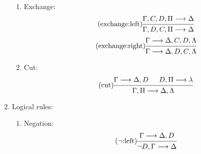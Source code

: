 \documentclass[11pt,a4paper]{article}
\begin{document}
\begin{definition}
\begin{enumerate}
\begin{enumerate}
            \item\label{it:exchange} Exchange:
                \begin{equation}
                    \tag{exchange:left}
                    \label{eq:exchange:left}
                    \begin{prooftree}
                        \hypo{\Gamma,C, D, \Pi\seq\Delta}
                        \infer1{\Gamma, D, C, \Pi\seq\Delta}
                    \end{prooftree}
                \end{equation}
                \begin{equation}
                    \tag{exchange:right}%
                    \label{eq:exchange:right}
                    \begin{prooftree}
                        \hypo{\Gamma\seq\Delta, C, D, \Lambda}
                        \infer1{\Gamma\seq\Delta, D, C, \Lambda}
                    \end{prooftree}
                \end{equation}
            \item\label{it:cut} Cut:
                \begin{equation}
                    \tag{cut}
                    \label{eq:cut}
                    \begin{prooftree}
                        \hypo{\Gamma\seq\Delta, D}
                        \hypo{D, \Pi\seq\lambda}
                        \infer2{\Gamma, \Pi\seq\Delta, \Lambda}
                    \end{prooftree}
                \end{equation}
        \end{enumerate}
    \item\label{it:logical rules} Logical rules:
        \begin{enumerate}
            \item\label{it:negation} Negation:
                \begin{equation}
                    \tag{\(\lnot\):left}
                    \label{eq:lnot:left}
                    \begin{prooftree}
                        \hypo{\Gamma\seq\Delta, D}
                        \infer1{\lnot D, \Gamma\seq\Delta}
                    \end{prooftree}
                \end{equation}
                \begin{equation}
                    \tag{\(\lnot\):right}

\end{equation}
\end{enumerate}
\end{enumerate}
\end{definition}
\end{document}
